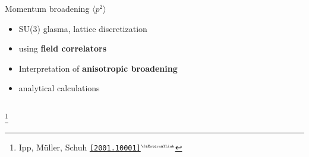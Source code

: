 \documentclass[aspectratio=169,11pt,usenames,dvipsnames]{beamer}
\renewcommand{\thefootnote}{\color{customblue}\faPaperPlaneO}
\newcommand\blfootnote[1]{%
  \begingroup
  \renewcommand\thefootnote{}\footnote{#1}%
  \addtocounter{footnote}{-1}%
  \endgroup
}
\begin{document}
\begin{frame}[t]
\begin{columns}[onlytextwidth,t]
        \begin{center}
            {\Large\color{palteal} Momentum broadening $\langle p^2\rangle$ \\[10pt]}
            \footnotesize
                \begin{itemize}
                    \item {\color{lightgray}SU(3) glasma, lattice discretization}
                    \item {\color{lightgray}{\bfseries Eikonal jets} using {\bfseries field correlators}}
                     \item {\color{lightgray}Interpretation of {\bfseries anisotropic broadening}}
                    \item {\color{lightgray}{\bfseries Weak field} analytical calculations}
                \end{itemize}
        \end{center}
    \end{columns}
    \blfootnote{\scriptsize Ipp, Müller, Schuh \href{https://arxiv.org/abs/2001.10001}{\color{palgold}\texttt{[2001.10001]}$^\text{\tiny\faExternalLink}$}}
\end{frame}


\end{document}
